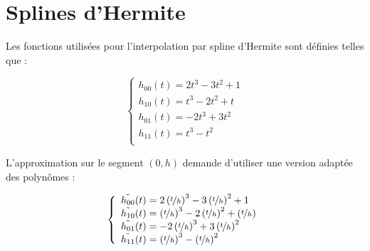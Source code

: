 \chapter{Splines d'Hermite}
\label{app:splines}

Les fonctions utilisées pour l'interpolation par spline d'Hermite sont définies telles que\cite{WPSplines} :

\begin{equation*}
\left\{
\begin{array}{l}
	h_{00}(t) = 2t^3-3t^2+1 \\
	h_{10}(t) = t^3-2t^2+t \\
	h_{01}(t) = -2t^3+3t^2 \\
	h_{11}(t) = t^3-t^2 \\
\end{array}
\right.
\end{equation*}


L'approximation sur le segment $(0,h)$ demande d'utiliser une version adaptée des polynômes :

\begin{equation*}
\left\{
\begin{array}{l}
	\tilde{h_{00}}(t) = 2\left(\nicefrac{t}{h}\right)^3-3\left(\nicefrac{t}{h}\right)^2+1 \\
	\tilde{h_{10}}(t) = \left(\nicefrac{t}{h}\right)^3-2\left(\nicefrac{t}{h}\right)^2+\left(\nicefrac{t}{h}\right) \\
	\tilde{h_{01}}(t) = -2\left(\nicefrac{t}{h}\right)^3+3\left(\nicefrac{t}{h}\right)^2 \\
	\tilde{h_{11}}(t) = \left(\nicefrac{t}{h}\right)^3-\left(\nicefrac{t}{h}\right)^2 \\
\end{array}
\right.
\end{equation*}


